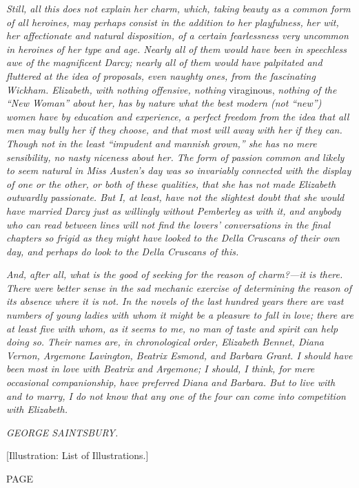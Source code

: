 \documentclass[12pt]{book}
\begin{document}
\textit{Still, all this does not explain her charm, which, taking beauty as a common form of all heroines, may perhaps consist in the addition to her playfulness, her wit, her affectionate and natural disposition, of a certain fearlessness very uncommon in heroines of her type and age. Nearly all of them would have been in speechless awe of the magnificent Darcy; nearly all of them would have palpitated and fluttered at the idea of proposals, even naughty ones, from the fascinating Wickham. Elizabeth, with nothing offensive, nothing} viraginous, \textit{nothing of the ``New Woman'' about her, has by nature what the best modern (not ``new'') women have by education and experience, a perfect freedom from the idea that all men may bully her if they choose, and that most will away with her if they can. Though not in the least ``impudent and mannish grown,'' she has no mere sensibility, no nasty niceness about her. The form of passion common and likely to seem natural in Miss Austen's day was so invariably connected with the display of one or the other, or both of these qualities, that she has not made Elizabeth outwardly passionate. But I, at least, have not the slightest doubt that she would have married Darcy just as willingly without Pemberley as with it, and anybody who can read between lines will not find the lovers' conversations in the final chapters so frigid as they might have looked to the Della Cruscans of their own day, and perhaps do look to the Della Cruscans of this.}

\textit{And, after all, what is the good of seeking for the reason of charm?---it is there. There were better sense in the sad mechanic exercise of determining the reason of its absence where it is not. In the novels of the last hundred years there are vast numbers of young ladies with whom it might be a pleasure to fall in love; there are at least five with whom, as it seems to me, no man of taste and spirit can help doing so. Their names are, in chronological order, Elizabeth Bennet, Diana Vernon, Argemone Lavington, Beatrix Esmond, and Barbara Grant. I should have been most in love with Beatrix and Argemone; I should, I think, for mere occasional companionship, have preferred Diana and Barbara. But to live with and to marry, I do not know that any one of the four can come into competition with Elizabeth.}

\textit{GEORGE SAINTSBURY.}

[Illustration: List of Illustrations.]

PAGE
\end{document}
